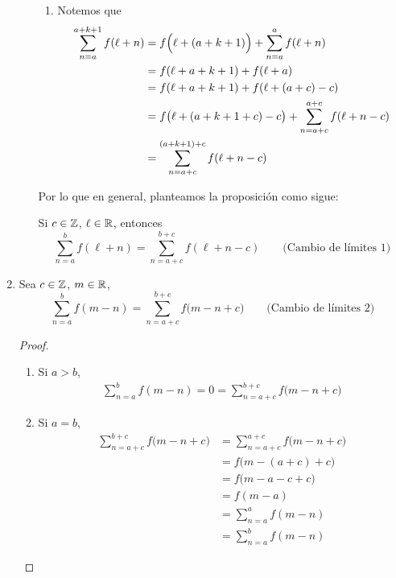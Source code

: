 \begin{enumerate}[label=\alph*)]
\begin{enumerate}[label=\Roman*)]
\begin{enumerate}[label=\roman*)]
      \item Notemos que
      \begin{align*}
        \sum_{n=a}^{a+k+1} f(\ell+n) &= f\Bigl(\ell+ (a+k+1)\Bigr) + \sum_{n=a}^{a} f(\ell+ n)\\
        &= f(\ell+a+k+1) + f(\ell+a)\\
        &= f(\ell+a+k+1) + f(\ell +(a+c)-c)\\
        &= f\bigl(\ell+(a+k+1+c)-c\bigr) + \sum_{n=a+c}^{a+c} f(\ell+ n-c)\\
        &= \sum_{n=a+c}^{(a+k+1)+c} f(\ell+n-c)
      \end{align*}
    \end{enumerate}


    Por lo que en general, planteamos la proposición como sigue:

    Si $c\in \mathbb{Z}$, $\ell \in \mathbb{R}$, entonces \[\sum_{n=a}^b f(\ell+n) = \sum_{n=a+c}^{b+c} f(\ell+n-c) \qquad \text{(Cambio de límites 1)}\]
    
  \end{enumerate}

  \item Sea $c\in \mathbb{Z}$, $m\in \mathbb{R}$, \[\sum_{n=a}^b f(m-n) = \sum_{n=a+c}^{b+c} f\bigl(m-n+c\bigr) \qquad \text{(Cambio de límites 2)}\]
  \begin{proof}\leavevmode
    \begin{enumerate}[label=\roman*)]
    \item Si $a>b$,
    \begin{align*}
      \sum_{n=a}^b f(m-n) = 0 = \sum_{n=a+c}^{b+c} f\bigl(m-n+c\bigr)
    \end{align*}

    \item Si $a=b$,
    \begin{align*}
      \sum_{n=a+c}^{b+c} f\bigl(m-n+c\bigr) &= \sum_{n=a+c}^{a+c} f\bigl(m-n+c\bigr)\\
      &= f\bigl(m-(a+c)+c\bigr)\\
      &= f\bigl(m-a-c+c\bigr)\\
      &= f(m-a)\\
      &= \sum_{n=a}^a f(m-n)\\
      &= \sum_{n=a}^b f(m-n)
    \end{align*}


\end{enumerate}
\end{proof}
\end{enumerate}
